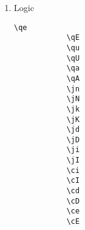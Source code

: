 \documentclass[10pt, a4paper]{article}
\begin{document}
\begin{enumerate}
\begin{center}
\begin{minipage}[h][7cm][t]{15em}
\begin{lstlisting}[style=B]
			\mx
			\mX
			\my
			\mY
			\mz
			\mZ
			\mi
			\mI
			\ms
			\mS
			\mr
			\mR
			\mp
			\mP
			\mq
			\mQ
				\end{lstlisting}
			\end{minipage}
			\begin{minipage}[h][7cm][t]{15em}
				\begin{fgls}
					\ \\
					\mx\\
					\mX\\
					\my\\
					\mY\\
					\mz\\
					\mZ\\
					\mi\\
					\mI\\
					\ms\\
					\mS\\
					\mr\\
					\mR\\
					\mp\\
					\mP\\
					\mq\\
					\mQ
				\end{fgls}
			\end{minipage}
		\end{center}
		\item Logic \begin{center}
			\begin{minipage}[h][8.6cm][t]{15em}
				\begin{lstlisting}[style=B]
			\qe
			\qE
			\qu
			\qU
			\qa
			\qA
			\jn
			\jN
			\jk
			\jK
			\jd
			\jD
			\ji
			\jI
			\ci
			\cI
			\cd
			\cD
			\ce
			\cE
				\end{lstlisting}
			\end{minipage}
			\begin{minipage}[h][8.6cm][t]{15em}
				\begin{fgls}
					\ \\
					\qe\\
					\qE\\
					\qu\\
					\qU\\
					\qa\\
					\qA\\
					\jn\\
					\jN\\
					\jk\\
					\jK\\
					\jd\\

\end{fgls}
\end{minipage}
\end{center}
\end{enumerate}
\end{document}
